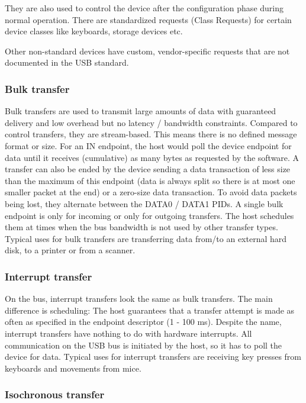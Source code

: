\documentclass{article}
\begin{document}
They are also used to control the device after the configuration phase during normal operation.
There are standardized requests (Class Requests) for certain device classes like keyboards, storage devices etc.

Other non-standard devices have custom, vendor-specific requests that are not documented
in the USB standard.

\subsubsection {Bulk transfer}

Bulk transfers are used to transmit large amounts of data with guaranteed delivery
and low overhead but no latency / bandwidth constraints.
Compared to control transfers, they are stream-based. This means there is no defined message
format or size. For an IN endpoint, the host would poll the device endpoint for data until it receives
(cumulative) as many bytes as requested by the software. A transfer can also be ended by the device sending
a data transaction of less size than the maximum of this endpoint (data is always split so there is at most one
smaller packet at the end) or a zero-size data transaction. To avoid data packets being lost, they
alternate between the DATA0 / DATA1 PIDs. A single bulk endpoint is only for incoming
or only for outgoing transfers.
The host schedules them at times when the bus bandwidth is not used by other transfer types.
Typical uses for bulk transfers are transferring data from/to an external hard disk,
to a printer or from a scanner. \cite[p. 52ff.]{usbstd}

\subsubsection {Interrupt transfer}

On the bus, interrupt transfers look the same as bulk transfers.
The main difference is scheduling: The host guarantees that a transfer
attempt is made as often as specified in the endpoint descriptor (1 - 100 ms).
Despite the name, interrupt transfers have nothing to do with hardware interrupts.
All communication on the USB bus is initiated by the host, so it has to poll the device
for data.
Typical uses for interrupt transfers are receiving key presses from keyboards and
movements from mice. \cite[p. 48ff.]{usbstd}

\subsubsection {Isochronous transfer}
\end{document}

